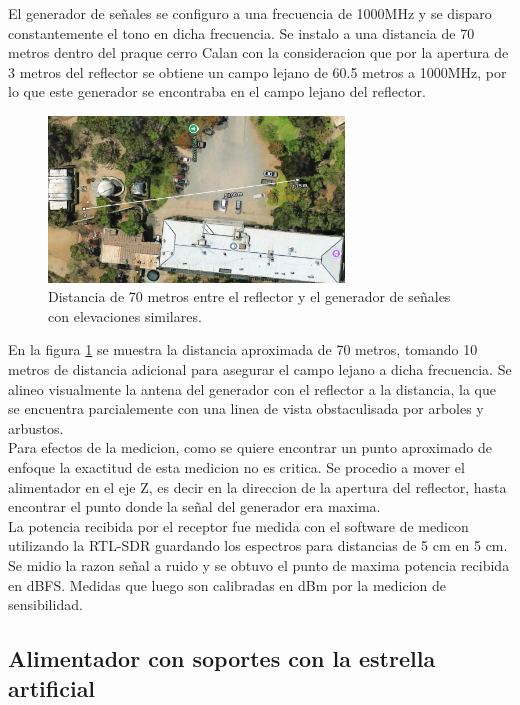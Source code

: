 El generador de señales se configuro a una frecuencia de 1000MHz y se disparo constantemente el tono en dicha frecuencia. Se instalo a una distancia de 70 metros dentro del praque cerro Calan con la consideracion que por la apertura de 3 metros del reflector se obtiene un campo lejano de 60.5 metros a 1000MHz, por lo que este generador se encontraba en el campo lejano del reflector.\\

\begin{figure}
    \centering
    \includegraphics[width=0.7\textwidth]{img/70m_measure}
    \caption{Distancia de 70 metros entre el reflector y el generador de señales con elevaciones similares.}
    \label{fig:70m_measure}
\end{figure} 

En la figura \ref{fig:70m_measure} se muestra la distancia aproximada de 70 metros, tomando 10 metros de distancia adicional para asegurar el campo lejano a dicha frecuencia. Se alineo visualmente la antena del generador con el reflector a la distancia, la que se encuentra parcialemente con una linea de vista obstaculisada por arboles y arbustos.\\

Para efectos de la medicion, como se quiere encontrar un punto aproximado de enfoque la exactitud de esta medicion no es critica. Se procedio a mover el alimentador en el eje Z, es decir en la direccion de la apertura del reflector, hasta encontrar el punto donde la señal del generador era maxima.\\

La potencia recibida por el receptor fue medida con el software de medicon utilizando la RTL-SDR guardando los espectros para distancias de 5 cm en 5 cm. Se midio la razon señal a ruido y se obtuvo el punto de maxima potencia recibida en dBFS. Medidas que luego son calibradas en dBm por la medicion de sensibilidad.\\

\subsection{Alimentador con soportes con la estrella artificial}

